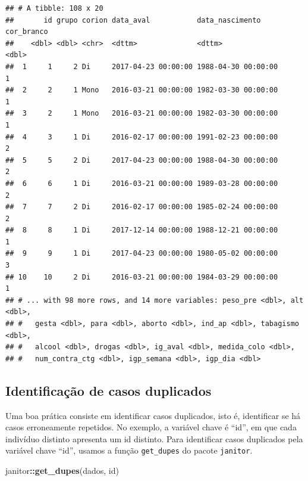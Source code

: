 \documentclass[
]{book}
\newenvironment{Shaded}{\begin{snugshade}}{\end{snugshade}}
\newcommand{\KeywordTok}[1]{\textcolor[rgb]{0.13,0.29,0.53}{\textbf{#1}}}
\newcommand{\NormalTok}[1]{#1}
\newcommand{\OperatorTok}[1]{\textcolor[rgb]{0.81,0.36,0.00}{\textbf{#1}}}
\begin{document}
\begin{verbatim}
## # A tibble: 108 x 20
##       id grupo corion data_aval           data_nascimento     cor_branco
##    <dbl> <dbl> <chr>  <dttm>              <dttm>                   <dbl>
##  1     1     2 Di     2017-04-23 00:00:00 1988-04-30 00:00:00          1
##  2     2     1 Mono   2016-03-21 00:00:00 1982-03-30 00:00:00          1
##  3     2     1 Mono   2016-03-21 00:00:00 1982-03-30 00:00:00          1
##  4     3     1 Di     2016-02-17 00:00:00 1991-02-23 00:00:00          2
##  5     5     2 Di     2017-04-23 00:00:00 1988-04-30 00:00:00          2
##  6     6     1 Di     2016-03-21 00:00:00 1989-03-28 00:00:00          2
##  7     7     2 Di     2016-02-17 00:00:00 1985-02-24 00:00:00          2
##  8     8     1 Di     2017-12-14 00:00:00 1988-12-21 00:00:00          1
##  9     9     1 Di     2017-04-23 00:00:00 1980-05-02 00:00:00          3
## 10    10     2 Di     2016-03-21 00:00:00 1984-03-29 00:00:00          1
## # ... with 98 more rows, and 14 more variables: peso_pre <dbl>, alt <dbl>,
## #   gesta <dbl>, para <dbl>, aborto <dbl>, ind_ap <dbl>, tabagismo <dbl>,
## #   alcool <dbl>, drogas <dbl>, ig_aval <dbl>, medida_colo <dbl>,
## #   num_contra_ctg <dbl>, igp_semana <dbl>, igp_dia <dbl>
\end{verbatim}

\hypertarget{identificauxe7uxe3o-de-casos-duplicados}{%
\subsection{Identificação de casos duplicados}\label{identificauxe7uxe3o-de-casos-duplicados}}

Uma boa prática consiste em identificar casos duplicados, isto é, identificar se há casos erroneamente repetidos. No exemplo, a variável chave é ``id'', em que cada indivíduo distinto apresenta um id distinto. Para identificar casos duplicados pela variável chave ``id'', usamos a função \texttt{get\_dupes} do pacote \texttt{janitor}.

\begin{Shaded}
\begin{Highlighting}[]
\NormalTok{janitor}\OperatorTok{::}\KeywordTok{get_dupes}\NormalTok{(dados, id)}
\end{Highlighting}
\end{Shaded}
\end{document}

